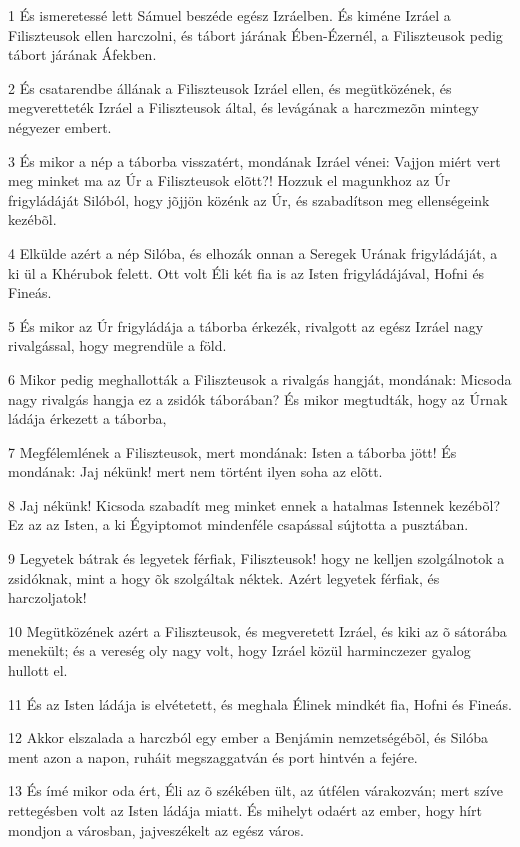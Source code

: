 \par 1 És ismeretessé lett Sámuel beszéde egész Izráelben. És kiméne Izráel a Filiszteusok ellen harczolni, és tábort járának Ében-Ézernél, a Filiszteusok pedig tábort járának Áfekben.
\par 2 És csatarendbe állának a Filiszteusok Izráel ellen, és megütközének, és megveretteték Izráel a Filiszteusok által, és levágának a harczmezõn mintegy négyezer embert.
\par 3 És mikor a nép a táborba visszatért, mondának Izráel vénei: Vajjon miért vert meg minket ma az Úr a Filiszteusok elõtt?! Hozzuk el magunkhoz az Úr frigyládáját Silóból, hogy jõjjön közénk az Úr, és szabadítson meg ellenségeink kezébõl.
\par 4 Elkülde azért a nép Silóba, és elhozák onnan a Seregek Urának frigyládáját, a ki ül a Khérubok felett. Ott volt Éli két fia is az Isten frigyládájával, Hofni és Fineás.
\par 5 És mikor az Úr frigyládája a táborba érkezék, rivalgott az egész Izráel nagy rivalgással, hogy megrendüle a föld.
\par 6 Mikor pedig meghallották a Filiszteusok a rivalgás hangját, mondának: Micsoda nagy rivalgás hangja ez a zsidók táborában? És mikor megtudták, hogy az Úrnak ládája érkezett a táborba,
\par 7 Megfélemlének a Filiszteusok, mert mondának: Isten a táborba jött! És mondának: Jaj nékünk! mert nem történt ilyen soha az elõtt.
\par 8 Jaj nékünk! Kicsoda szabadít meg minket ennek a hatalmas Istennek kezébõl? Ez az az Isten, a ki Égyiptomot mindenféle csapással sújtotta a pusztában.
\par 9 Legyetek bátrak és legyetek férfiak, Filiszteusok! hogy ne kelljen szolgálnotok a zsidóknak, mint a hogy õk szolgáltak néktek. Azért legyetek férfiak, és harczoljatok!
\par 10 Megütközének azért a Filiszteusok, és megveretett Izráel, és kiki az õ sátorába menekült; és a vereség oly nagy volt, hogy Izráel közül harminczezer gyalog hullott el.
\par 11 És az Isten ládája is elvétetett, és meghala Élinek mindkét fia, Hofni és Fineás.
\par 12 Akkor elszalada a harczból egy ember a Benjámin nemzetségébõl, és Silóba ment azon a napon, ruháit megszaggatván és port hintvén a fejére.
\par 13 És ímé mikor oda ért, Éli az õ székében ült, az útfélen várakozván; mert szíve rettegésben volt az Isten ládája miatt. És mihelyt odaért az ember, hogy hírt mondjon a városban, jajveszékelt az egész város.
